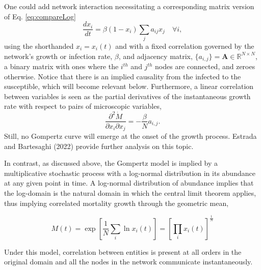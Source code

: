 \documentclass[sn-mathphys]{sn-jnl}%
\theoremstyle{thmstyleone}%
\theoremstyle{thmstyletwo}%
\theoremstyle{thmstylethree}%
\begin{document}
One could add network interaction necessitating a corresponding matrix version of Eq. \ref{eq:compareLog}
\begin{equation}
\label{eq:networkSIR}
\frac{d x_i}{dt} = \beta (1-x_i)\sum_j{a_{ij}}x_j \quad \forall i,
\end{equation}
using the shorthanded $x_i=x_i(t)$ and with a fixed correlation governed by the network's growth or infection rate, $\beta$, and adjacency matrix, $\{a_{i,j}\}=\mathbf{A} \in \mathbb{R}^{N \times N}$, a binary matrix with ones where the $i^{th}$ and $j^{th}$ nodes are connected, and zeroes otherwise. Notice that there is an implied causality from the infected to the susceptible, which will become relevant below. Furthermore, a linear correlation between variables is seen as the partial derivatives of the instantaneous growth rate with respect to pairs of microscopic variables,
\begin{equation}
\frac{\partial^2 \dot{M}}{\partial x_i \partial x_j} = -\frac{\beta}{N} a_{i,j}.
\end{equation}
Still, no Gompertz curve will emerge at the onset of the growth process. Estrada and Bartesaghi (2022) \cite{estrada2022networked} provide further analysis on this topic.

In contrast, as discussed above, the Gompertz model is implied by a multiplicative stochastic process with a log-normal distribution in its abundance at any given point in time. A log-normal distribution of abundance implies that the log-domain is the natural domain in which the central limit theorem applies, thus implying correlated mortality growth through the geometric mean,

\begin{equation}
M(t) = \exp \left[\frac{1}{N}\sum_i \ln x_i(t)\right] = \left[\prod_i x_i (t)\right]^{\frac{1}{N}}
\end{equation} 

Under this model, correlation between entities is present at all orders in the original domain and all the nodes in the network communicate instantaneously.
\end{document}
